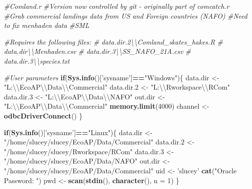 \documentclass[]{article}
\newenvironment{Shaded}{\begin{snugshade}}{\end{snugshade}}
\newcommand{\KeywordTok}[1]{\textcolor[rgb]{0.13,0.29,0.53}{\textbf{#1}}}
\newcommand{\DataTypeTok}[1]{\textcolor[rgb]{0.13,0.29,0.53}{#1}}
\newcommand{\DecValTok}[1]{\textcolor[rgb]{0.00,0.00,0.81}{#1}}
\newcommand{\CharTok}[1]{\textcolor[rgb]{0.31,0.60,0.02}{#1}}
\newcommand{\StringTok}[1]{\textcolor[rgb]{0.31,0.60,0.02}{#1}}
\newcommand{\CommentTok}[1]{\textcolor[rgb]{0.56,0.35,0.01}{\textit{#1}}}
\newcommand{\ControlFlowTok}[1]{\textcolor[rgb]{0.13,0.29,0.53}{\textbf{#1}}}
\newcommand{\OperatorTok}[1]{\textcolor[rgb]{0.81,0.36,0.00}{\textbf{#1}}}
\newcommand{\NormalTok}[1]{#1}
\begin{document}
\begin{Shaded}
\begin{Highlighting}[]
\CommentTok{#Comland.r}
\CommentTok{#Version now controlled by git - originally part of comcatch.r}
\CommentTok{#Grab commercial landings data from US and Foreign countries (NAFO)}
\CommentTok{#Need to fix menhaden data}
\CommentTok{#SML}

\CommentTok{#Requires the following files:}
\CommentTok{# data.dir.2\textbackslash{}\textbackslash{}Comland_skates_hakes.R}
\CommentTok{# data.dir\textbackslash{}\textbackslash{}Menhaden.csv}
\CommentTok{# data.dir.3\textbackslash{}\textbackslash{}SS_NAFO_21A.csv}
\CommentTok{# data.dir.3\textbackslash{}\textbackslash{}species.txt}

\CommentTok{#User parameters}
\ControlFlowTok{if}\NormalTok{(}\KeywordTok{Sys.info}\NormalTok{()[}\StringTok{'sysname'}\NormalTok{]}\OperatorTok{==}\StringTok{"Windows"}\NormalTok{)\{}
\NormalTok{  data.dir   <-}\StringTok{ "L:}\CharTok{\textbackslash{}\textbackslash{}}\StringTok{EcoAP}\CharTok{\textbackslash{}\textbackslash{}}\StringTok{Data}\CharTok{\textbackslash{}\textbackslash{}}\StringTok{Commercial"}
\NormalTok{  data.dir.}\DecValTok{2}\NormalTok{ <-}\StringTok{ "L:}\CharTok{\textbackslash{}\textbackslash{}}\StringTok{Rworkspace}\CharTok{\textbackslash{}\textbackslash{}}\StringTok{RCom"}
\NormalTok{  data.dir.}\DecValTok{3}\NormalTok{ <-}\StringTok{ "L:}\CharTok{\textbackslash{}\textbackslash{}}\StringTok{EcoAP}\CharTok{\textbackslash{}\textbackslash{}}\StringTok{Data}\CharTok{\textbackslash{}\textbackslash{}}\StringTok{NAFO"}
\NormalTok{  out.dir    <-}\StringTok{ "L:}\CharTok{\textbackslash{}\textbackslash{}}\StringTok{EcoAP}\CharTok{\textbackslash{}\textbackslash{}}\StringTok{Data}\CharTok{\textbackslash{}\textbackslash{}}\StringTok{Commercial"}
  \KeywordTok{memory.limit}\NormalTok{(}\DecValTok{4000}\NormalTok{)}
\NormalTok{  channel <-}\StringTok{ }\KeywordTok{odbcDriverConnect}\NormalTok{()}
\NormalTok{\}}

\ControlFlowTok{if}\NormalTok{(}\KeywordTok{Sys.info}\NormalTok{()[}\StringTok{'sysname'}\NormalTok{]}\OperatorTok{==}\StringTok{"Linux"}\NormalTok{)\{}
\NormalTok{  data.dir   <-}\StringTok{ "/home/slucey/slucey/EcoAP/Data/Commercial"}
\NormalTok{  data.dir.}\DecValTok{2}\NormalTok{ <-}\StringTok{ "/home/slucey/slucey/Rworkspace/RCom"}
\NormalTok{  data.dir.}\DecValTok{3}\NormalTok{ <-}\StringTok{ "/home/slucey/slucey/EcoAP/Data/NAFO"}
\NormalTok{  out.dir    <-}\StringTok{ "/home/slucey/slucey/EcoAP/Data/Commercial"}
\NormalTok{  uid <-}\StringTok{ 'slucey'}
  \KeywordTok{cat}\NormalTok{(}\StringTok{"Oracle Password: "}\NormalTok{)}
\NormalTok{  pwd <-}\StringTok{ }\KeywordTok{scan}\NormalTok{(}\KeywordTok{stdin}\NormalTok{(), }\KeywordTok{character}\NormalTok{(), }\DataTypeTok{n =} \DecValTok{1}\NormalTok{)}
\NormalTok{\}}


\end{Highlighting}
\end{Shaded}
\end{document}
